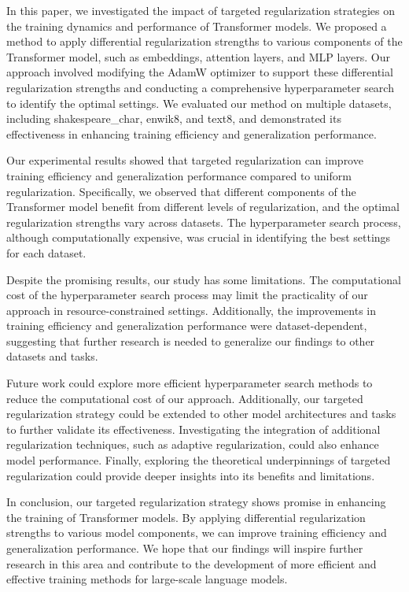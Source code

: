 \documentclass{article} %
\begin{document}
In this paper, we investigated the impact of targeted regularization strategies on the training dynamics and performance of Transformer models. We proposed a method to apply differential regularization strengths to various components of the Transformer model, such as embeddings, attention layers, and MLP layers. Our approach involved modifying the AdamW optimizer to support these differential regularization strengths and conducting a comprehensive hyperparameter search to identify the optimal settings. We evaluated our method on multiple datasets, including shakespeare\_char, enwik8, and text8, and demonstrated its effectiveness in enhancing training efficiency and generalization performance.

Our experimental results showed that targeted regularization can improve training efficiency and generalization performance compared to uniform regularization. Specifically, we observed that different components of the Transformer model benefit from different levels of regularization, and the optimal regularization strengths vary across datasets. The hyperparameter search process, although computationally expensive, was crucial in identifying the best settings for each dataset.

Despite the promising results, our study has some limitations. The computational cost of the hyperparameter search process may limit the practicality of our approach in resource-constrained settings. Additionally, the improvements in training efficiency and generalization performance were dataset-dependent, suggesting that further research is needed to generalize our findings to other datasets and tasks.

Future work could explore more efficient hyperparameter search methods to reduce the computational cost of our approach. Additionally, our targeted regularization strategy could be extended to other model architectures and tasks to further validate its effectiveness. Investigating the integration of additional regularization techniques, such as adaptive regularization, could also enhance model performance. Finally, exploring the theoretical underpinnings of targeted regularization could provide deeper insights into its benefits and limitations.

In conclusion, our targeted regularization strategy shows promise in enhancing the training of Transformer models. By applying differential regularization strengths to various model components, we can improve training efficiency and generalization performance. We hope that our findings will inspire further research in this area and contribute to the development of more efficient and effective training methods for large-scale language models.



\end{document}
